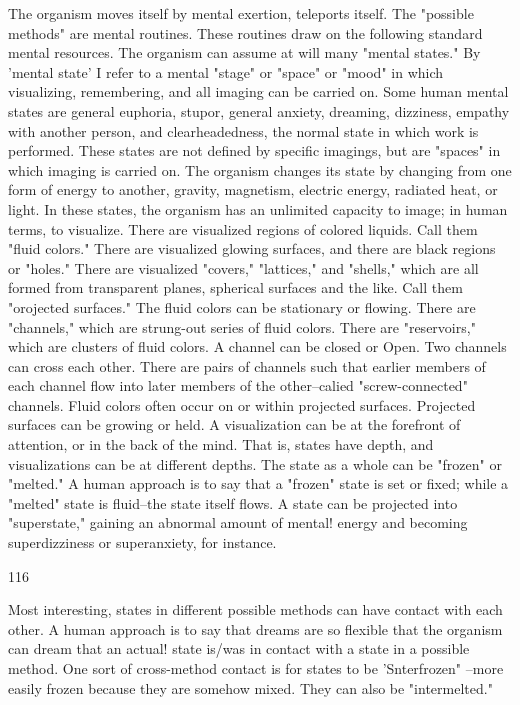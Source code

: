 \documentclass[10pt,twoside]{memoir}
\begin{document}
\begin{enumerate}
{\begin{enumerate}
\begin{sysrules}
\begin{sysrules}
\begin{sysrules}
\begin{sysrules}
{\begin{enumerate}
{The organism moves itself by mental exertion, teleports itself. The 
"possible methods" are mental routines. These routines draw on the 
following standard mental resources. The organism can assume at will many 
"mental states." By 'mental state' I refer to a mental "stage" or "space" or 
"mood" in which visualizing, remembering, and all imaging can be carried 
on. Some human mental states are general euphoria, stupor, general anxiety, 
dreaming, dizziness, empathy with another person, and clearheadedness, the 
normal state in which work is performed. These states are not defined by 
specific imagings, but are "spaces" in which imaging is carried on. The 
organism changes its state by changing from one form of energy to another, 
gravity, magnetism, electric energy, radiated heat, or light. In these states, 
the organism has an unlimited capacity to image; in human terms, to 
visualize. There are visualized regions of colored liquids. Call them "fluid 
colors." There are visualized glowing surfaces, and there are black regions or 
"holes." There are visualized "covers," "lattices," and "shells," which are all 
formed from transparent planes, spherical surfaces and the like. Call them 
"orojected surfaces." The fluid colors can be stationary or flowing. There are 
"channels," which are strung-out series of fluid colors. There are 
"reservoirs," which are clusters of fluid colors. A channel can be closed or 
Open. Two channels can cross each other. There are pairs of channels such 
that earlier members of each channel flow into later members of the 
other--calied "screw-connected" channels. Fluid colors often occur on or 
within projected surfaces. Projected surfaces can be growing or held. A 
visualization can be at the forefront of attention, or in the back of the mind. 
That is, states have depth, and visualizations can be at different depths. The 
state as a whole can be "frozen" or "melted." A human approach is to say 
that a "frozen" state is set or fixed; while a "melted" state is fluid--the state 
itself flows. A state can be projected into "superstate," gaining an abnormal 
amount of mental! energy and becoming superdizziness or superanxiety, for 
instance. 


116 


Most interesting, states in different possible methods can have contact 
with each other. A human approach is to say that dreams are so flexible that 
the organism can dream that an actual! state is/was in contact with a state in 
a possible method. One sort of cross-method contact is for states to be 
'Snterfrozen" --more easily frozen because they are somehow mixed. They 
can also be "intermelted." 

}
\end{enumerate}}
\end{sysrules}
\end{sysrules}
\end{sysrules}
\end{sysrules}
\end{enumerate}}
\end{enumerate}
\end{document}
